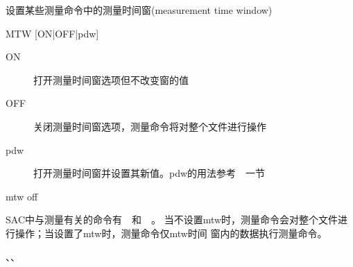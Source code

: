 \label{cmd:mtw}

设置某些测量命令中的测量时间窗(measurement time window)

\begin{SACSTX}
MTW [ON|OFF|pdw]
\end{SACSTX}

\begin{description}
\item [ON] 打开测量时间窗选项但不改变窗的值
\item [OFF] 关闭测量时间窗选项，测量命令将对整个文件进行操作
\item [pdw] 打开测量时间窗并设置其新值。pdw的用法参考~~一节
\end{description}

\begin{SACDFT}
mtw off
\end{SACDFT}

SAC中与测量有关的命令有~~和~~。
当不设置mtw时，测量命令会对整个文件进行操作；当设置了mtw时，测量命令仅mtw时间
窗内的数据执行测量命令。

、、
